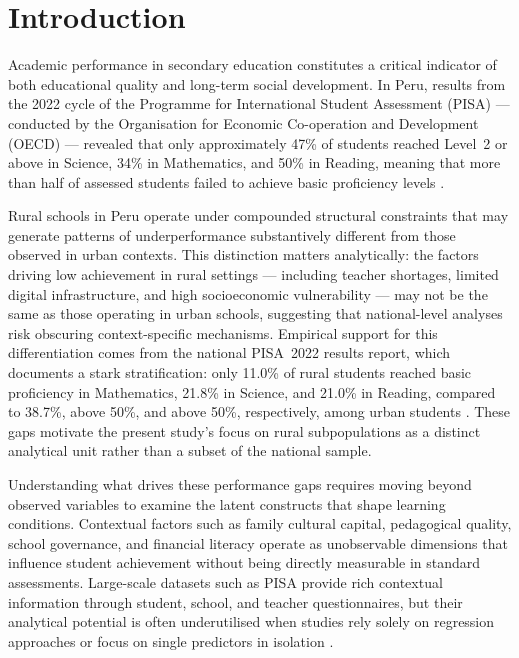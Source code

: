 \documentclass[twocolumn,12pt]{article}
\begin{document}

\section{Introduction}

Academic performance in secondary education constitutes a critical indicator
of both educational quality and long-term social development. In Peru, results
from the 2022 cycle of the Programme for International Student Assessment
(PISA) --- conducted by the Organisation for Economic Co-operation and
Development (OECD) --- revealed that only approximately 47\% of students
reached Level~2 or above in Science, 34\% in Mathematics, and 50\% in
Reading, meaning that more than half of assessed students failed to achieve
basic proficiency levels \parencite{oecd2023pisaPeru}.

Rural schools in Peru operate under compounded structural constraints that
may generate patterns of underperformance substantively different from those
observed in urban contexts. This distinction matters analytically: the factors
driving low achievement in rural settings --- including teacher shortages,
limited digital infrastructure, and high socioeconomic vulnerability --- may
not be the same as those operating in urban schools, suggesting that
national-level analyses risk obscuring context-specific mechanisms. Empirical
support for this differentiation comes from the national PISA~2022 results
report, which documents a stark stratification: only 11.0\% of rural students
reached basic proficiency in Mathematics, 21.8\% in Science, and 21.0\% in
Reading, compared to 38.7\%, above 50\%, and above 50\%, respectively, among
urban students \parencite{minedu2024pisareporte}. These gaps motivate the
present study's focus on rural subpopulations as a distinct analytical unit
rather than a subset of the national sample.

Understanding what drives these performance gaps requires moving beyond
observed variables to examine the latent constructs that shape learning
conditions. Contextual factors such as family cultural capital, pedagogical
quality, school governance, and financial literacy operate as unobservable
dimensions that influence student achievement without being directly
measurable in standard assessments. Large-scale datasets such as PISA provide
rich contextual information through student, school, and teacher
questionnaires, but their analytical potential is often underutilised when
studies rely solely on regression approaches or focus on single predictors in
isolation \parencite{rutkowski2010secondary}.
\end{document}
